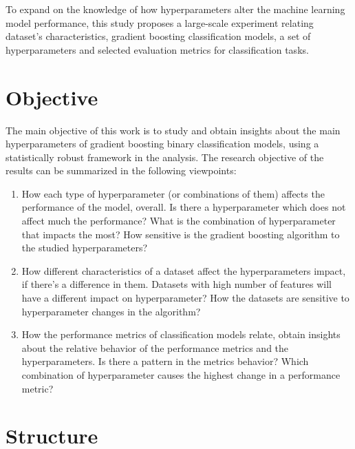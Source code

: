 To expand on the knowledge of how hyperparameters alter the machine learning model performance, this study proposes a large-scale experiment relating dataset's characteristics, gradient boosting classification models, a set of hyperparameters and selected evaluation metrics for classification tasks.

\section{Objective}
\label{sec:objetivo}

The main objective of this work is to study and obtain insights about the main hyperparameters of gradient boosting binary classification models, using a statistically robust framework in the analysis. The research objective of the results can be summarized in the following viewpoints:

\begin{enumerate}
  \item How each type of hyperparameter (or combinations of them) affects the performance of the model, overall. Is there a hyperparameter which does not affect much the performance? What is the combination of hyperparameter that impacts the most? How sensitive is the gradient boosting algorithm to the studied hyperparameters?
  \item How different characteristics of a dataset affect the hyperparameters impact, if there's a difference in them. Datasets with high number of features will have a different impact on hyperparameter? How the datasets are sensitive to hyperparameter changes in the algorithm?
  \item How the performance metrics of classification models relate, obtain insights about the relative behavior of the performance metrics and the hyperparameters. Is there a pattern in the metrics behavior? Which combination of hyperparameter causes the highest change in a performance metric?
\end{enumerate}


\section{Structure}
\label{sec:organizacao_trabalho}

